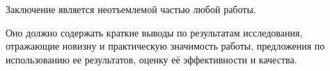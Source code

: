 \documentclass[%
]{ittmm}
\begin{document}
Заключение является неотъемлемой частью любой работы.

Оно должно содержать краткие выводы по результатам исследования,
отражающие новизну и практическую значимость работы, предложения по
использованию ее результатов, оценку её эффективности и качества.







\end{document}
